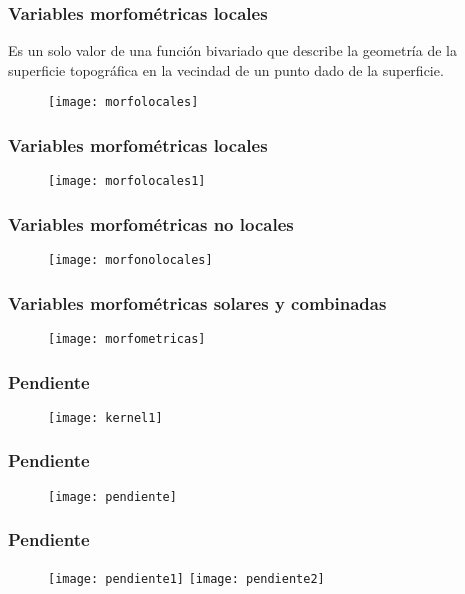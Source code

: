 \documentclass{beamer}
\begin{document}
\begin{frame}
\frametitle{Variables morfométricas locales}
\small{Es un solo valor de una función bivariado que describe la geometría de la superficie topográfica en la vecindad de un punto dado de la superficie.} 
 \begin{figure}
    \centering
    \texttt{[image: morfolocales]}
  \end{figure}
\end{frame}
\begin{frame}
\frametitle{Variables morfométricas locales}
 \begin{figure}
    \centering
    \texttt{[image: morfolocales1]}
  \end{figure}
\end{frame}
\begin{frame}
\frametitle{Variables morfométricas no locales}
 \begin{figure}
    \centering
    \texttt{[image: morfonolocales]}
  \end{figure}
\end{frame}
\begin{frame}
\frametitle{Variables morfométricas solares y combinadas}
 \begin{figure}
    \centering
    \texttt{[image: morfometricas]}
  \end{figure}
\end{frame}
\begin{frame}
\frametitle{Pendiente}
 \begin{figure}
    \centering
    \texttt{[image: kernel1]}
  \end{figure}
\end{frame}
\begin{frame}
\frametitle{Pendiente}
 \begin{figure}
    \centering
    \texttt{[image: pendiente]}
  \end{figure}
\end{frame}
\begin{frame}
\frametitle{Pendiente}
 \begin{figure}
    \centering
    \texttt{[image: pendiente1]}
    \texttt{[image: pendiente2]}
  \end{figure}
\end{frame}
\end{document}
